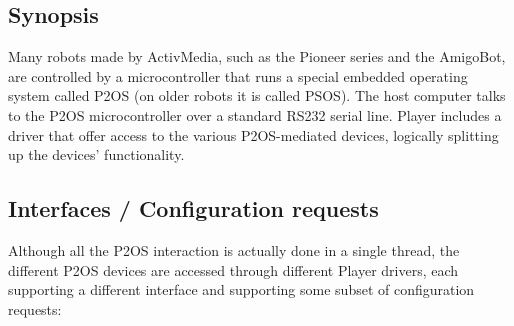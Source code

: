 \subsection*{Synopsis}
Many robots made by ActivMedia, such as the Pioneer series and the AmigoBot,
are controlled by a microcontroller that runs a special embedded operating
system called P2OS (on older robots it is called PSOS).  The host computer
talks to the P2OS microcontroller over a standard RS232 serial line.  Player
includes a driver that offer access to the various P2OS-mediated devices,
logically splitting up the devices' functionality.

\subsection*{Interfaces / Configuration requests}
Although all the P2OS interaction is actually done in a single thread, the
different P2OS devices are accessed through different Player drivers, each
supporting a different interface and supporting some subset of configuration
requests:
